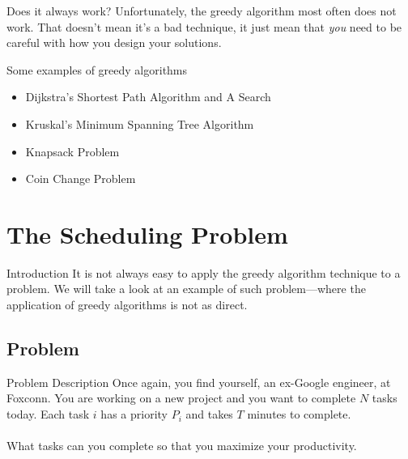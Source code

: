 \documentclass{beamer}
\begin{document}
\begin{frame}{Does it always work?}
    Unfortunately, the greedy algorithm most often does not work. That doesn't mean it's a bad technique, it just mean that \textit{you} need to be careful with how you design your solutions.
\end{frame}

\begin{frame}{Some examples of greedy algorithms}
    \begin{itemize}
        \item Dijkstra's Shortest Path Algorithm and A\* Search
        \item Kruskal's Minimum Spanning Tree Algorithm
        \item Knapsack Problem
        \item Coin Change Problem
    \end{itemize}
\end{frame}

\section{The Scheduling Problem}
\begin{frame}{Introduction}
    It is not always easy to apply the greedy algorithm technique to a problem. We will take a look at an example of such problem---where the application of greedy algorithms is not as direct.
\end{frame}

\subsection{Problem}
\begin{frame}{Problem Description}
    Once again, you find yourself, an ex-Google engineer, at Foxconn. You are working on a new project and you want to complete $N$ tasks today. Each task $i$ has a priority $P_i$ and takes $T$ minutes to complete.\\~\\
    
    What tasks can you complete so that you maximize your productivity.
\end{frame}
\end{document}
